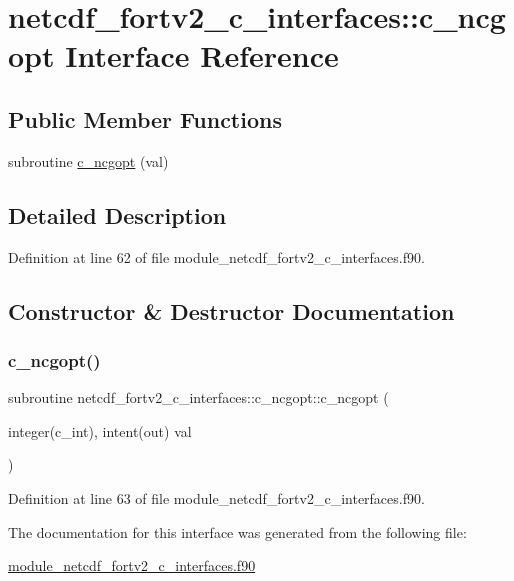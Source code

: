 \hypertarget{interfacenetcdf__fortv2__c__interfaces_1_1c__ncgopt}{}\section{netcdf\+\_\+fortv2\+\_\+c\+\_\+interfaces\+:\+:c\+\_\+ncgopt Interface Reference}
\label{interfacenetcdf__fortv2__c__interfaces_1_1c__ncgopt}
\subsection*{Public Member Functions}
\begin{DoxyCompactItemize}
\item 
subroutine \hyperlink{interfacenetcdf__fortv2__c__interfaces_1_1c__ncgopt_a8a84d078dd89bacda4e05442ad986b50}{c\+\_\+ncgopt} (val)
\end{DoxyCompactItemize}


\subsection{Detailed Description}


Definition at line 62 of file module\+\_\+netcdf\+\_\+fortv2\+\_\+c\+\_\+interfaces.\+f90.



\subsection{Constructor \& Destructor Documentation}
\mbox{\label{interfacenetcdf__fortv2__c__interfaces_1_1c__ncgopt_a8a84d078dd89bacda4e05442ad986b50}} 
\subsubsection{\texorpdfstring{c\+\_\+ncgopt()}{c\_ncgopt()}}
{\footnotesize\ttfamily subroutine netcdf\+\_\+fortv2\+\_\+c\+\_\+interfaces\+::c\+\_\+ncgopt\+::c\+\_\+ncgopt (\begin{DoxyParamCaption}\item[{integer(c\+\_\+int), intent(out)}]{val }\end{DoxyParamCaption})}



Definition at line 63 of file module\+\_\+netcdf\+\_\+fortv2\+\_\+c\+\_\+interfaces.\+f90.



The documentation for this interface was generated from the following file\+:\begin{DoxyCompactItemize}
\item 
\hyperlink{module__netcdf__fortv2__c__interfaces_8f90}{module\+\_\+netcdf\+\_\+fortv2\+\_\+c\+\_\+interfaces.\+f90}\end{DoxyCompactItemize}

